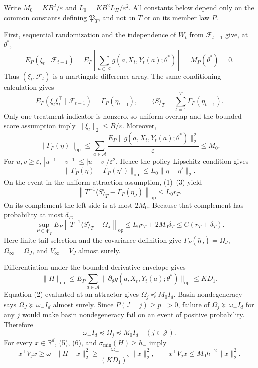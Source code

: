 Write \(M_0=KB^2/\varepsilon\) and \(L_0=KB^2L_\Pi/\varepsilon^2\).  All constants below depend only on the common constants defining \(\mathfrak P_T\), and not on \(T\) or on its member law \(P\).

First, sequential randomization and the independence of \(W_t\) from \(\mathcal F_{t-1}\) give, at \(\theta^*\),
\[
 E_P(\xi_t\mid\mathcal F_{t-1})
 =E_P\!\left[\sum_{a\in\mathcal A}g(a,X_t,Y_t(a);\theta^*)\right]
 =M_P(\theta^*)=0.
\]
Thus \((\xi_t,\mathcal F_t)\) is a martingale-difference array.  The same conditioning calculation gives
\[
 E_P(\xi_t\xi_t^\top\mid\mathcal F_{t-1})
 =\Gamma_P(\eta_{t-1}),
 \qquad
 \langle S\rangle_T=\sum_{t=1}^T\Gamma_P(\eta_{t-1}).                                    \tag{1}
\]
Only one treatment indicator is nonzero, so uniform overlap and the bounded-score assumption imply \(\|\xi_t\|_2\le B/\varepsilon\).  Moreover,
\[
 \|\Gamma_P(\eta)\|_{\mathrm{op}}
 \le \sum_{a\in\mathcal A}\frac{E_P\|g(a,X_t,Y_t(a);\theta^*)\|_2^2}{\varepsilon}
 \le M_0.                                                                  \tag{2}
\]
For \(u,v\ge\varepsilon\), \(|u^{-1}-v^{-1}|\le |u-v|/\varepsilon^2\).  Hence the policy Lipschitz condition gives
\[
 \|\Gamma_P(\eta)-\Gamma_P(\eta')\|_{\mathrm{op}}
 \le L_0\|\eta-\eta'\|_2.                                                \tag{3}
\]
On the event in the uniform attraction assumption, (1)--(3) yield
\[
 \left\|T^{-1}\langle S\rangle_T-\Gamma_P(\bar\eta_J)\right\|_{\mathrm{op}}
 \le L_0r_T.
\]
On its complement the left side is at most \(2M_0\).  Because that complement has probability at most \(\delta_T\),
\[
 \sup_{P\in\mathfrak P_T}E_P\left\|T^{-1}\langle S\rangle_T-\Omega_J\right\|_{\mathrm{op}}
 \le L_0r_T+2M_0\delta_T\le C(r_T+\delta_T).                              \tag{4}
\]
Here finite-tail selection and the covariance definition give \(\Gamma_P(\bar\eta_J)=\Omega_J\), \(\Omega_\infty=\Omega_J\), and \(V_\infty=V_J\) almost surely.

Differentiation under the bounded derivative envelope gives
\[
 \|H\|_{\mathrm{op}}
 \le E_P\sum_{a\in\mathcal A}\|\partial_\theta g(a,X_t,Y_t(a);\theta^*)\|_{\mathrm{op}}
 \le KD_1.                                                                 \tag{5}
\]
Equation (2) evaluated at an attractor gives \(\Omega_j\preceq M_0I_d\).  Basin nondegeneracy says \(\Omega_J\succeq\omega_-I_d\) almost surely.  Since \(P(J=j)\ge p_->0\), failure of \(\Omega_j\succeq\omega_-I_d\) for any \(j\) would make basin nondegeneracy fail on an event of positive probability.  Therefore
\[
 \omega_-I_d\preceq\Omega_j\preceq M_0I_d\quad(j\in\mathcal J).          \tag{6}
\]
For every \(x\in\mathbb R^d\), (5), (6), and \(\sigma_{\min}(H)\ge h_-\) imply
\[
 x^\top V_jx\ge\omega_-\|H^{-\top}x\|_2^2
 \ge\frac{\omega_-}{(KD_1)^2}\|x\|_2^2,
 \qquad
 x^\top V_jx\le M_0h_-^{-2}\|x\|_2^2.                                  \tag{7}
\]

